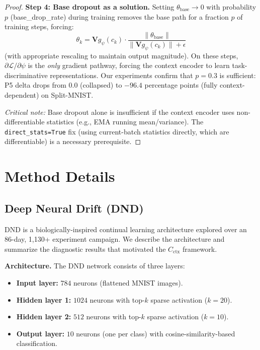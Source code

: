 \documentclass{article}
\begin{document}
\begin{proof}
\textbf{Step 4: Base dropout as a solution.}
Setting $\theta_\mathrm{base} \to 0$ with probability $p$ (base\_drop\_rate) during training removes the base path for a fraction $p$ of training steps, forcing:
\begin{equation}
    \theta_k = \mathbf{V} g_\psi(c_k) \cdot \frac{\|\theta_\mathrm{base}\|}{\|\mathbf{V} g_\psi(c_k)\| + \epsilon}
\end{equation}
(with appropriate rescaling to maintain output magnitude). On these steps, $\partial \mathcal{L}/\partial \psi$ is the \emph{only} gradient pathway, forcing the context encoder to learn task-discriminative representations. Our experiments confirm that $p = 0.3$ is sufficient: P5 delta drops from $0.0$ (collapsed) to $-96.4$ percentage points (fully context-dependent) on Split-MNIST.

\emph{Critical note:} Base dropout alone is insufficient if the context encoder uses non-differentiable statistics (e.g., EMA running mean/variance). The \texttt{direct\_stats=True} fix (using current-batch statistics directly, which are differentiable) is a necessary prerequisite.
\end{proof}


\section{Method Details}
\label{app:methods}

\subsection{Deep Neural Drift (DND)}
\label{app:dnd}

DND is a biologically-inspired continual learning architecture explored over an 86-day, 1,130+ experiment campaign. We describe the architecture and summarize the diagnostic results that motivated the $C_\mathrm{ctx}$ framework.

\textbf{Architecture.}
The DND network consists of three layers:
\begin{itemize}
    \item \textbf{Input layer:} $784$ neurons (flattened MNIST images).
    \item \textbf{Hidden layer 1:} $1024$ neurons with top-$k$ sparse activation ($k=20$).
    \item \textbf{Hidden layer 2:} $512$ neurons with top-$k$ sparse activation ($k=10$).
    \item \textbf{Output layer:} $10$ neurons (one per class) with cosine-similarity-based classification.
\end{itemize}
\end{document}

